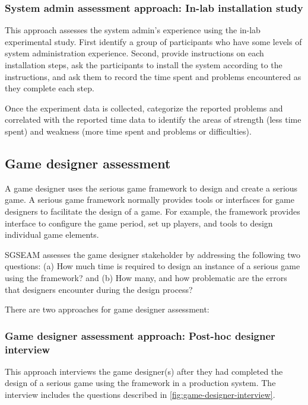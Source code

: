 \documentclass[11pt,oneside]{book}
\begin{document}
\subsubsection{System admin assessment approach: In-lab installation study}
\label{In-lab installation study}

This approach assesses the system admin's experience using the in-lab experimental study. First identify a group 
of participants who have some levels of system administration experience. Second, provide instructions on 
each installation steps, ask the participants to install the system according to the instructions, and ask them to record 
the time spent and problems encountered as they complete each step.

Once the experiment data is collected, categorize the reported problems and correlated with the reported time data 
to identify the areas of strength (less time spent) and weakness (more time spent and problems or difficulties). 

\subsection{Game designer assessment}

A game designer uses the serious game framework to design and create a serious game.
A serious game framework normally provides tools or interfaces for game designers
to facilitate the design of a game. For example, the framework provides interface to configure the game period, set up 
players, and tools to design individual game elements.

SGSEAM assesses the game designer stakeholder by addressing the following two questions: (a) How
much time is required to design an instance of a serious game using the framework? and (b) How
many, and how problematic are the errors that designers encounter during the design process?

There are two approaches for game designer assessment:

\subsubsection{Game designer assessment approach: Post-hoc designer interview}
\label{Post-hoc game designer interview}

This approach interviews the game designer(s) after they had completed the design of a serious game using the 
framework in a production system. The interview includes the questions described in \autoref{fig:game-designer-interview}.
 
\end{document}
